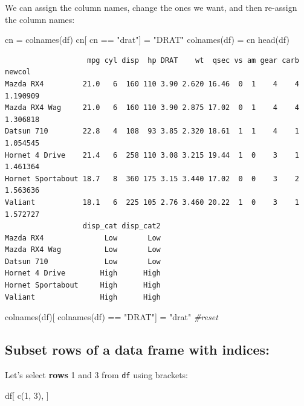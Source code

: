 \documentclass[
]{article}
\newenvironment{Shaded}{\begin{snugshade}}{\end{snugshade}}
\newcommand{\CommentTok}[1]{\textcolor[rgb]{0.56,0.35,0.01}{\textit{#1}}}
\newcommand{\DecValTok}[1]{\textcolor[rgb]{0.00,0.00,0.81}{#1}}
\newcommand{\FunctionTok}[1]{\textcolor[rgb]{0.00,0.00,0.00}{#1}}
\newcommand{\NormalTok}[1]{#1}
\newcommand{\OtherTok}[1]{\textcolor[rgb]{0.56,0.35,0.01}{#1}}
\newcommand{\SpecialCharTok}[1]{\textcolor[rgb]{0.00,0.00,0.00}{#1}}
\newcommand{\StringTok}[1]{\textcolor[rgb]{0.31,0.60,0.02}{#1}}
\begin{document}
We can assign the column names, change the ones we want, and then
re-assign the column names:

\begin{Shaded}
\begin{Highlighting}[]
\NormalTok{cn }\OtherTok{=} \FunctionTok{colnames}\NormalTok{(df)}
\NormalTok{cn[ cn }\SpecialCharTok{==} \StringTok{"drat"}\NormalTok{] }\OtherTok{=} \StringTok{"DRAT"}
\FunctionTok{colnames}\NormalTok{(df) }\OtherTok{=}\NormalTok{ cn}
\FunctionTok{head}\NormalTok{(df)}
\end{Highlighting}
\end{Shaded}

\begin{verbatim}
                   mpg cyl disp  hp DRAT    wt  qsec vs am gear carb   newcol
Mazda RX4         21.0   6  160 110 3.90 2.620 16.46  0  1    4    4 1.190909
Mazda RX4 Wag     21.0   6  160 110 3.90 2.875 17.02  0  1    4    4 1.306818
Datsun 710        22.8   4  108  93 3.85 2.320 18.61  1  1    4    1 1.054545
Hornet 4 Drive    21.4   6  258 110 3.08 3.215 19.44  1  0    3    1 1.461364
Hornet Sportabout 18.7   8  360 175 3.15 3.440 17.02  0  0    3    2 1.563636
Valiant           18.1   6  225 105 2.76 3.460 20.22  1  0    3    1 1.572727
                  disp_cat disp_cat2
Mazda RX4              Low       Low
Mazda RX4 Wag          Low       Low
Datsun 710             Low       Low
Hornet 4 Drive        High      High
Hornet Sportabout     High      High
Valiant               High      High
\end{verbatim}

\begin{Shaded}
\begin{Highlighting}[]
\FunctionTok{colnames}\NormalTok{(df)[ }\FunctionTok{colnames}\NormalTok{(df) }\SpecialCharTok{==} \StringTok{"DRAT"}\NormalTok{] }\OtherTok{=} \StringTok{"drat"} \CommentTok{\#reset}
\end{Highlighting}
\end{Shaded}

\hypertarget{subset-rows-of-a-data-frame-with-indices}{%
\subsection{Subset rows of a data frame with
indices:}\label{subset-rows-of-a-data-frame-with-indices}}

Let's select \textbf{rows} 1 and 3 from \texttt{df} using brackets:

\begin{Shaded}
\begin{Highlighting}[]
\NormalTok{df[ }\FunctionTok{c}\NormalTok{(}\DecValTok{1}\NormalTok{, }\DecValTok{3}\NormalTok{), ]}
\end{Highlighting}
\end{Shaded}
\end{document}
